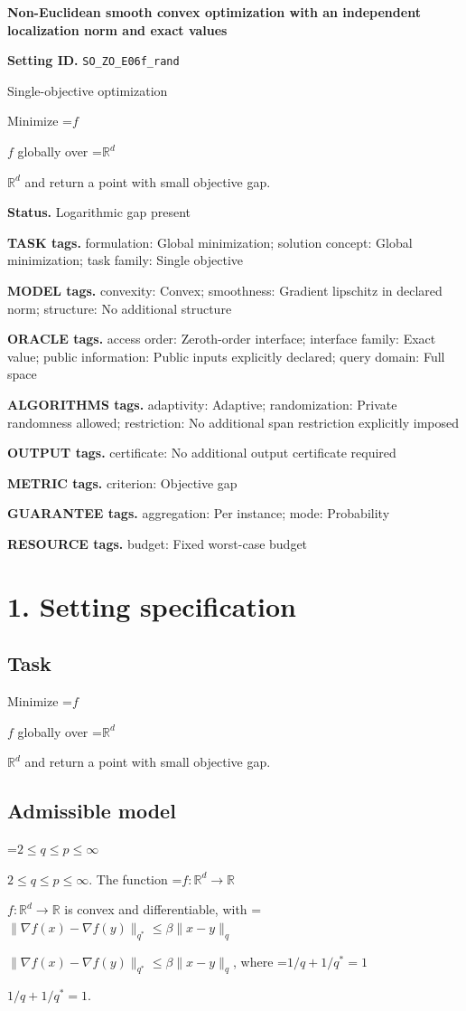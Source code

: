 \documentclass[10pt,a4paper]{article}
\newcommand{\AtlasMath}[1]{\par\begingroup\centering\setbox0=\hbox{$\displaystyle #1$}\ifdim\wd0>1.4\linewidth\typeout{ATLAS WIDE FORMULA: \the\wd0}\fi\ifdim\wd0>\linewidth\resizebox{\linewidth}{!}{\box0}\else\box0\fi\par\endgroup}
\newcommand{\AtlasInlineMath}[1]{\begingroup\setbox0=\hbox{$#1$}\ifdim\wd0>.4\linewidth\endgroup\AtlasMath{#1}\else\endgroup$#1$\fi}
\begin{document}
\raggedright

{\LARGE\bfseries\sffamily\color{AtlasNavy} Non-Euclidean smooth convex optimization with an independent localization norm and exact values\par}\vspace{5pt}
\textbf{Setting ID.} \texttt{SO\_\allowbreak{}ZO\_\allowbreak{}E06f\_\allowbreak{}rand}

Single-objective optimization

Minimize \AtlasInlineMath{f} globally over \AtlasInlineMath{\mathbb{R}^d} and return a point with small objective gap.

\textbf{Status.} Logarithmic gap present

\textbf{TASK tags.} formulation: Global minimization; solution concept: Global minimization; task family: Single objective

\textbf{MODEL tags.} convexity: Convex; smoothness: Gradient lipschitz in declared norm; structure: No additional structure

\textbf{ORACLE tags.} access order: Zeroth-order interface; interface family: Exact value; public information: Public inputs explicitly declared; query domain: Full space

\textbf{ALGORITHMS tags.} adaptivity: Adaptive; randomization: Private randomness allowed; restriction: No additional span restriction explicitly imposed

\textbf{OUTPUT tags.} certificate: No additional output certificate required

\textbf{METRIC tags.} criterion: Objective gap

\textbf{GUARANTEE tags.} aggregation: Per instance; mode: Probability

\textbf{RESOURCE tags.} budget: Fixed worst-case budget

\section{1. Setting specification}
\subsection{Task}
Minimize \AtlasInlineMath{f} globally over \AtlasInlineMath{\mathbb{R}^d} and return a point with small objective gap.

\subsection{Admissible model}
\AtlasInlineMath{2\le q\le p\le\infty}. The function \AtlasInlineMath{f:\mathbb{R}^d\to\mathbb{R}} is convex and differentiable, with \AtlasInlineMath{\|\nabla f(x)-\nabla f(y)\|_{q^*}\le\beta\|x-y\|_q}, where \AtlasInlineMath{1/q+1/q^*=1}.
\end{document}
